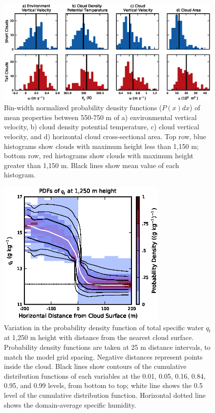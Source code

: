 \documentclass[acp]{copernicus}
\begin{document}
\begin{figure}[t]
\vspace*{2mm}
\begin{center}
\includegraphics[width=\textwidth]{./figures/cloud_environment_histograms}
\end{center}
\caption{Bin-width normalized probability density functions ($P(x)dx$) of 
mean properties between 550-750 m of a) environmental vertical velocity, 
b) cloud density potential temperature, c) cloud vertical velocity, and 
d) horizontal cloud cross-sectional area.  Top row, blue histograms show clouds 
with maximum height less than 1,150 m; bottom row, red histograms show clouds 
with maximum height greater than 1,150 m.  Black lines show mean value of each 
histogram.}
\label{fig:cloud_environment_histograms}
\end{figure}

\begin{figure}[t]
\vspace*{2mm}
\begin{center}
\includegraphics[width=8.3cm]{./figures/qt_vs_dist}
\end{center}
\caption{Variation in the probability density function of total specific 
water $q_t$ at 1,250 m height with distance from the nearest cloud surface.  
Probability density functions are taken at 25 m distance intervals, to match 
the model grid spacing.  Negative distances represent points inside the cloud.  
Black lines show contours of the cumulative distribution functions of each 
variables at the 0.01, 0.05, 0.16, 0.84, 0.95, and 0.99 levels, from bottom to 
top; white line shows the 0.5 level of the cumulative distribution function. 
Horizontal dotted line shows the domain-average specific humidity.}
\label{fig:qt_vs_dist}
\end{figure}
\end{document}
